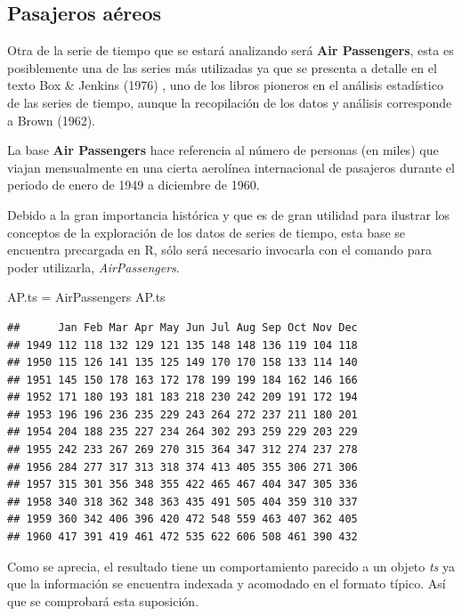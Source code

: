 \documentclass[
  spanish,
]{book}
\newenvironment{Shaded}{\begin{snugshade}}{\end{snugshade}}
\newcommand{\NormalTok}[1]{#1}
\newcommand{\OtherTok}[1]{\textcolor[rgb]{0.56,0.35,0.01}{#1}}
\theoremstyle{remark}
\begin{document}
\hypertarget{pasajeros-auxe9reos}{%
\subsection{Pasajeros aéreos}\label{pasajeros-auxe9reos}}

Otra de la serie de tiempo que se estará analizando será \textbf{Air Passengers}, esta es posiblemente una de las series más utilizadas ya que se presenta a detalle en el texto Box \& Jenkins (1976) , uno de los libros pioneros en el análisis estadístico de las series de tiempo, aunque la recopilación de los datos y análisis corresponde a Brown (1962).

La base \textbf{Air Passengers} hace referencia al número de personas (en miles) que viajan mensualmente en una cierta aerolínea internacional de pasajeros durante el periodo de enero de 1949 a diciembre de 1960.

Debido a la gran importancia histórica y que es de gran utilidad para ilustrar los conceptos de la exploración de los datos de series de tiempo, esta base se encuentra precargada en R, sólo será necesario invocarla con el comando para poder utilizarla, \emph{AirPassengers}.

\begin{Shaded}
\begin{Highlighting}[]
\NormalTok{AP.ts }\OtherTok{=}\NormalTok{ AirPassengers}
\NormalTok{AP.ts}
\end{Highlighting}
\end{Shaded}

\begin{verbatim}
##      Jan Feb Mar Apr May Jun Jul Aug Sep Oct Nov Dec
## 1949 112 118 132 129 121 135 148 148 136 119 104 118
## 1950 115 126 141 135 125 149 170 170 158 133 114 140
## 1951 145 150 178 163 172 178 199 199 184 162 146 166
## 1952 171 180 193 181 183 218 230 242 209 191 172 194
## 1953 196 196 236 235 229 243 264 272 237 211 180 201
## 1954 204 188 235 227 234 264 302 293 259 229 203 229
## 1955 242 233 267 269 270 315 364 347 312 274 237 278
## 1956 284 277 317 313 318 374 413 405 355 306 271 306
## 1957 315 301 356 348 355 422 465 467 404 347 305 336
## 1958 340 318 362 348 363 435 491 505 404 359 310 337
## 1959 360 342 406 396 420 472 548 559 463 407 362 405
## 1960 417 391 419 461 472 535 622 606 508 461 390 432
\end{verbatim}

Como se aprecia, el resultado tiene un comportamiento parecido a un objeto \emph{ts} ya que la información se encuentra indexada y acomodado en el formato típico. Así que se comprobará esta suposición.
\end{document}
